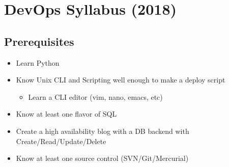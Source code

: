 \documentclass[12pt]{article}
\begin{document}
\newpage

\section{DevOps Syllabus (2018)}

\subsection{Prerequisites}
\begin{itemize}
\item Learn Python
\item Know Unix CLI and Scripting well enough to make a deploy script
  \begin{itemize}
  \item Learn a CLI editor (vim, nano, emacs, etc)
  \end{itemize}
\item Know at least one flavor of SQL
\item Create a high availability blog with a DB backend with
  Create/Read/Update/Delete
\item Know at least one source control (SVN/Git/Mercurial)
\end{itemize}
\end{document}
